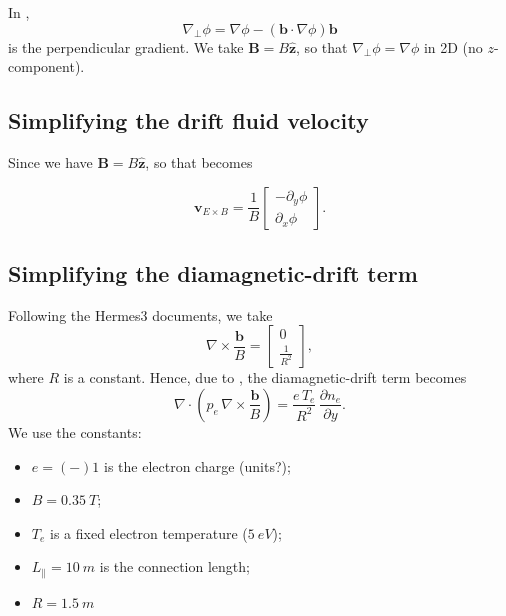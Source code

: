 \documentclass[12pt]{article}
\begin{document}
In ,
%
\begin{equation}
    \nabla_\perp \phi = \nabla \phi - ( \bm{b} \cdot \nabla \phi ) \bm{b}
\end{equation}
%
is the perpendicular gradient. We take $\bm{B} = B \hat{\bm{z}}$, so that $\nabla_\perp \phi = \nabla \phi$ in 2D (no $z$-component).

\subsection{Simplifying the drift fluid velocity}

Since we have $\bm{B} = B \hat{\bm{z}}$, so that  becomes
%

\begin{equation}
    \bm{v}_{E \times B} = \frac{1}{B}
    \begin{bmatrix}
        - \partial_y \phi \\
        \partial_x \phi
    \end{bmatrix}
    .
\end{equation}

\subsection{Simplifying the diamagnetic-drift term}

Following the Hermes3 documents, we take
%
\begin{equation}
    \nabla \times \frac{\bm{b}}{B} =
    \begin{bmatrix}
        0 \\
        \frac{1}{R^2}
    \end{bmatrix}
    ,
\end{equation}
%
where $R$ is a constant. Hence, due to , the diamagnetic-drift term becomes
%
\begin{equation}
    \nabla \cdot \left( p_e \, \nabla \times \frac{\bm{b}}{B} \right) =
    \frac{e \, T_e}{R^2} \, \frac{\partial n_e}{\partial y}.
\end{equation}
%
We use the constants:
%
\begin{itemize}
    \item $e = (-)1$ is the electron charge (units?);
    \item $B = \SI{0.35}{T}$;
    \item $T_e$ is a fixed electron temperature ($\SI{5}{eV}$);
    \item $L_\parallel = \SI{10}{m}$ is the connection length;
    \item $R = \SI{1.5}{m}$
\end{itemize}
\end{document}
